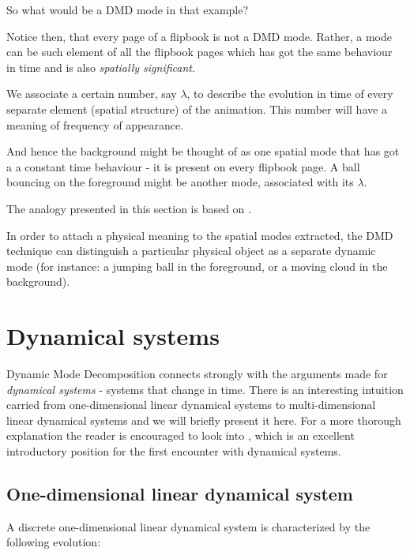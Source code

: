 \documentclass[10pt,twocolumn]{article}
\begin{document}
So what would be a DMD mode in that example?

Notice then, that every page of a flipbook is not a DMD mode. Rather, a mode can be such element of all the flipbook pages which has got the same behaviour in time and is also \textit{spatially significant}.

We associate a certain number, say $\lambda$, to describe the evolution in time of every separate element (spatial structure) of the animation. This number will have a meaning of frequency of appearance.

And hence the background might be thought of as one spatial mode that has got a a constant time behaviour - it is present on every flipbook page. A ball bouncing on the foreground might be another mode, associated with its $\lambda$. 

The analogy presented in this section is based on \cite{Grosek}.

In order to attach a physical meaning to the spatial modes extracted, the DMD technique can distinguish a particular physical object as a separate dynamic mode (for instance: a jumping ball in the foreground, or a moving cloud in the background).


\section{Dynamical systems}

Dynamic Mode Decomposition connects strongly with the arguments made for \textit{dynamical systems} - systems that change in time. There is an interesting intuition carried from one-dimensional linear dynamical systems to multi-dimensional linear dynamical systems and we will briefly present it here. For a more thorough explanation the reader is encouraged to look into \cite{Prof_Edward_Scheinerman}, which is an excellent introductory position for the first encounter with dynamical systems.


\subsection{One-dimensional linear dynamical system}

A discrete one-dimensional linear dynamical system is characterized by the following evolution:
\end{document}
